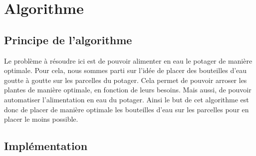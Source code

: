\documentclass[french,a4paper]{article}
\begin{document}
\newpage
\section{Algorithme}
\subsection{Principe de l'algorithme}
Le problème à résoudre ici est de pouvoir alimenter en eau le potager de manière optimale. Pour cela, nous sommes parti sur l'idée de placer des bouteilles d'eau goutte à goutte sur les parcelles du potager. 
Cela permet de pouvoir arroser les plantes de manière optimale, en fonction de leurs besoins. Mais aussi, de pouvoir automatiser l'alimentation en eau du potager.
Ainsi le but de cet algorithme est donc de placer de manière optimale les bouteilles d'eau sur les parcelles pour en placer le moins possible.
\subsection{Implémentation}
\end{document}
